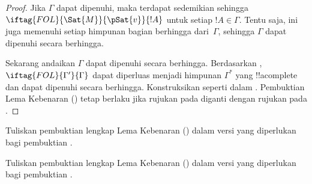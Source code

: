 \documentclass[../../../include/open-logic-section]{subfiles}
\begin{document}
\begin{proof}
Jika $\Gamma$ dapat dipenuhi, maka terdapat
sedemikian sehingga $\iftag{FOL}{\Sat{M}}{\pSat{v}}{!A}$ untuk setiap
$!A \in \Gamma$. Tentu saja,
 ini juga memenuhi setiap
himpunan bagian berhingga dari~$\Gamma$, sehingga $\Gamma$ dapat dipenuhi
secara berhingga.

Sekarang andaikan $\Gamma$ dapat dipenuhi secara berhingga.
Berdasarkan ,
$\iftag{FOL}{\Gamma'}{\Gamma}$ dapat diperluas menjadi himpunan
$\Gamma^*$ yang !!a{complete} dan dapat dipenuhi secara
berhingga. Konstruksikan
 seperti dalam
. Pembuktian Lema
Kebenaran () tetap berlaku jika rujukan pada
 diganti dengan rujukan pada
.
\end{proof}

\begin{prob}
Tuliskan pembuktian lengkap Lema Kebenaran
() dalam versi yang diperlukan bagi
pembuktian .
\end{prob}
\tagendprob

\begin{prob}
Tuliskan pembuktian lengkap Lema Kebenaran
() dalam versi yang diperlukan bagi
pembuktian .
\end{prob}
\tagendprob
\end{document}
